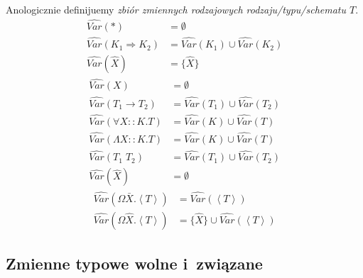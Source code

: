 \documentclass[11pt,leqno]{article}
\begin{document}
\begin{definicja}
Anologicznie definijuemy \emph{zbiór zmiennych rodzajowych rodzaju/typu/schematu $T$}.
\begin{align*}
\widehat{Var}(*) & = \emptyset \\
\widehat{Var}(K_1 \Rightarrow K_2) & = \widehat{Var}(K_1) \cup \widehat{Var}(K_2) \\
\widehat{Var}(\widehat{X}) & = \{ \widehat{X} \}
\end{align*}
\begin{align*}
\widehat{Var}(X) & = \emptyset \\
\widehat{Var}(T_1 \to T_2) & = \widehat{Var}(T_1) \cup \widehat{Var}(T_2) \\
\widehat{Var}(\forall X :: K.T) & = \widehat{Var}(K) \cup \widehat{Var}(T) \\
\widehat{Var}(\Lambda X :: K.T) & = \widehat{Var}(K) \cup \widehat{Var}(T) \\
\widehat{Var}(T_1 \; T_2) & = \widehat{Var}(T_1) \cup \widehat{Var}(T_2) \\
\widehat{Var}(\widehat{X}) & = \emptyset
\end{align*}
\begin{align*}
\widehat{Var}(\Omega \bar{X}.\left<T\right>) & = \widehat{Var}(\left<T\right>) \\
\widehat{Var}(\Omega \widehat{X}.\left<T\right>) & = \{ \widehat{X} \} \cup \widehat{Var}(\left<T\right>)
\end{align*}
\end{definicja}

\subsection{Zmienne typowe wolne i~związane}
\end{document}
